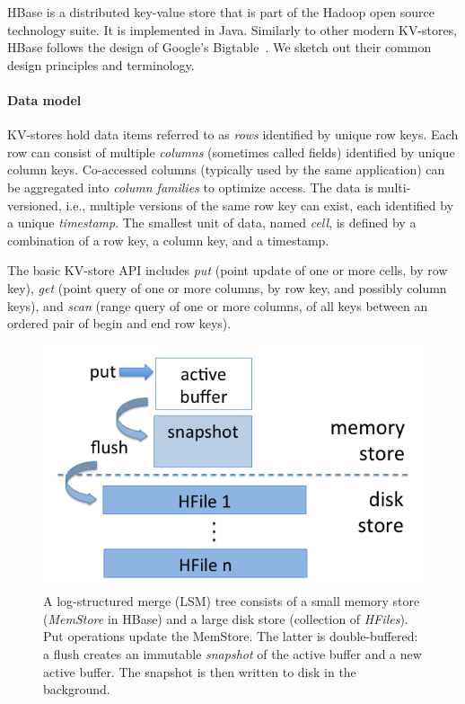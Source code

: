 
HBase is a distributed key-value store that is part of the Hadoop open source  technology suite. 
It is implemented in Java. Similarly to other modern KV-stores, HBase follows the design of 
Google's Bigtable~\cite{Chang2008}. We sketch out their common design principles 
and terminology. 

\paragraph{Data model}
KV-stores hold data items referred to as \emph{rows} identified by unique 
row keys. Each row can consist of multiple \emph{columns} (sometimes called fields) identified by unique 
column keys. Co-accessed columns (typically used by the same application) can be 
aggregated into  \emph{column families} to optimize access. The data is multi-versioned, 
i.e., multiple versions of the same row key can exist, each identified by a unique {\em timestamp}. 
The smallest unit of data, named {\em cell}, is defined by a combination of a row key, a
column key, and a timestamp.

The basic KV-store API includes \emph{put} (point update of one or more cells, by row key), 
\emph{get} (point query of one or more columns, by row key, and possibly column keys), 
and \emph{scan} (range query of one or more columns, of all keys between 
an ordered pair of begin and end row keys). 

\begin{figure}[tb]
\center
\includegraphics[width=0.9\columnwidth]{LSM} 
\caption{A log-structured merge (LSM) tree consists of a small memory store ({\em MemStore} in HBase) 
and a large disk store (collection of {\em HFiles}). Put operations update the MemStore. The latter is 
double-buffered: a flush creates an immutable \emph{snapshot} of the active buffer and  a new active 
buffer. The snapshot is then written to disk in the background.}
\label{fig:LSM}
\end{figure}

